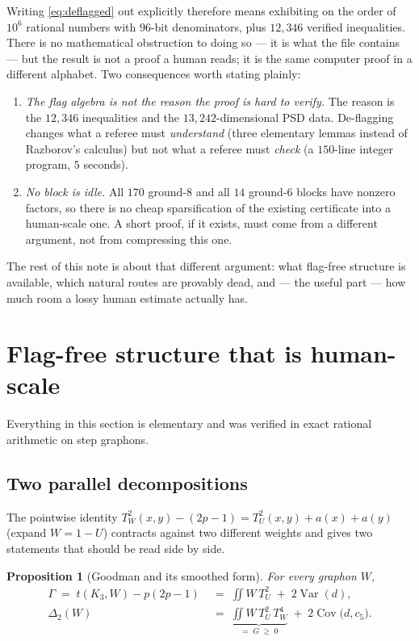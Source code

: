 \documentclass[11pt]{article}
\newtheorem{proposition}[theorem]{Proposition}
\theoremstyle{definition}
\newcommand{\Var}{\operatorname{Var}}
\newcommand{\Cov}{\operatorname{Cov}}
\newcommand{\tw}{T_W}
\newcommand{\tu}{T_U}
\begin{document}
Writing \eqref{eq:deflagged} out explicitly therefore means exhibiting on the
order of $10^6$ rational numbers with $96$-bit denominators, plus $12{,}346$
verified inequalities.  There is no mathematical obstruction to doing so --- it
is what the file contains --- but the result is not a proof a human reads; it is
the same computer proof in a different alphabet.  Two consequences worth
stating plainly:

\begin{enumerate}[leftmargin=1.6em]
\item \emph{The flag algebra is not the reason the proof is hard to verify.}
The reason is the $12{,}346$ inequalities and the $13{,}242$-dimensional PSD
data.  De-flagging changes what a referee must \emph{understand} (three
elementary lemmas instead of Razborov's calculus) but not what a referee must
\emph{check} (a $150$-line integer program, $5$ seconds).
\item \emph{No block is idle.} All $170$ ground-$8$ and all $14$ ground-$6$
blocks have nonzero factors, so there is no cheap sparsification of the existing
certificate into a human-scale one.  A short proof, if it exists, must come from
a different argument, not from compressing this one.
\end{enumerate}

The rest of this note is about that different argument: what flag-free structure
is available, which natural routes are provably dead, and --- the useful part
--- how much room a lossy human estimate actually has.

\section{Flag-free structure that is human-scale}\label{sec:structure}

Everything in this section is elementary and was verified in exact rational
arithmetic on step graphons.

\subsection{Two parallel decompositions}

The pointwise identity $\tw^2(x,y)-(2p-1)=\tu^2(x,y)+a(x)+a(y)$ (expand
$W=1-U$) contracts against two different weights and gives two statements that
should be read side by side.

\begin{proposition}[Goodman and its smoothed form]\label{prop:parallel}
For every graphon $W$,
\begin{align}
  \Gamma\;=\;t(K_3,W)-p(2p-1)\;&=\;\iint W\,\tu^2\;+\;2\Var(d),
  \label{eq:goodman-split}\\
  \Delta_2(W)\;&=\;\underbrace{\iint W\,\tu^2\,\tw^4}_{=\;G\;\ge\;0}
  \;+\;2\Cov\big(d,c_5\big).
  \label{eq:delta-split}
\end{align}
\end{proposition}
\end{document}
